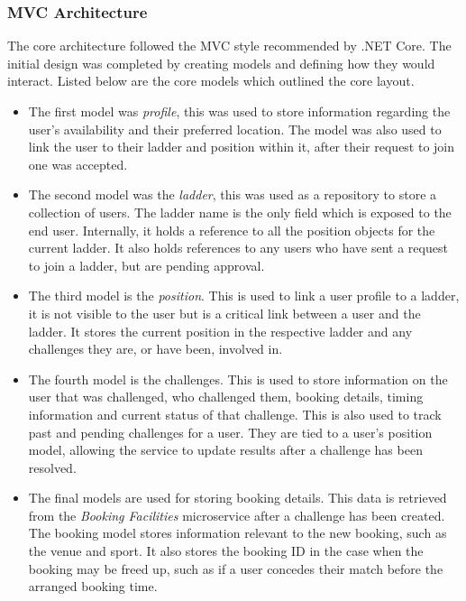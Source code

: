 \subsubsection{MVC Architecture}
\par
The core architecture followed the MVC style recommended by .NET Core. The initial design was completed by creating models and defining how they would interact. Listed below are the core models which outlined the core layout.

\begin{itemize}

	\item The first model was \textit{profile}, this was used to store information regarding the user's availability and their preferred location. The model was also used to link the user to their ladder and position within it, after their request to join one was accepted.

	\item The second model was the \textit{ladder}, this was used as a repository to store a collection of users. The ladder name is the only field which is exposed to the end user. Internally, it holds a reference to all the position objects for the current ladder. It also holds references to any users who have sent a request to join a ladder, but are pending approval.

	\item The third model is the \textit{position}. This is used to link a user profile to a ladder, it is not visible to the user but is a critical link between a user and the ladder. It stores the current position in the respective ladder and any challenges they are, or have been, involved in.

	\item The fourth model is the challenges. This is used to store information on the user that was challenged, who challenged them, booking details, timing information and current status of that challenge. This is also used to track past and pending challenges for a user. They are tied to a user's position model, allowing the service to update results after a challenge has been resolved.

	\item The final models are used for storing booking details. This data is retrieved from the \textit{Booking Facilities} microservice after a challenge has been created. The booking model stores information relevant to the new booking, such as the venue and sport. It also stores the booking ID in the case when the booking may be freed up, such as if a user concedes their match before the arranged booking time.

\end{itemize}

